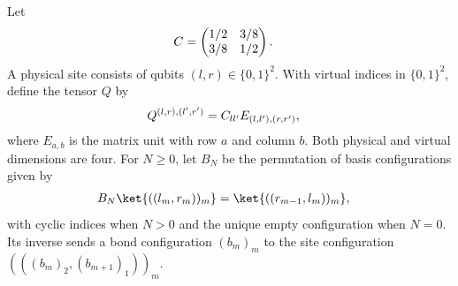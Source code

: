 \begin{definition}%
    \label{def:mpdo_twisted_dimer_bond_tensor}
    \leanok
    Let
    \begin{align}
        C & =\begin{pmatrix}1/2&3/8\\3/8&1/2\end{pmatrix}.
        \notag
    \end{align}
    A physical site consists of qubits $(l,r)\in\{0,1\}^2$.
    With virtual indices in $\{0,1\}^2$, define the tensor $Q$ by
    \begin{align}
        Q^{(l,r),(l',r')} & =C_{ll'}E_{(l,l'),(r,r')},
        \notag
    \end{align}
    where $E_{a,b}$ is the matrix unit with row $a$ and column $b$.
    Both physical and virtual dimensions are four. For $N\ge0$, let
    $B_N$ be the permutation of basis configurations given by
    \begin{align}
        B_N\ket{((l_m,r_m))_m} & =\ket{((r_{m-1},l_m))_m},
        \notag
    \end{align}
    with cyclic indices when $N>0$ and the unique empty configuration
    when $N=0$. Its inverse sends a bond configuration $(b_m)_m$
    to the site configuration $(((b_m)_2,(b_{m+1})_1))_m$.
\end{definition}

